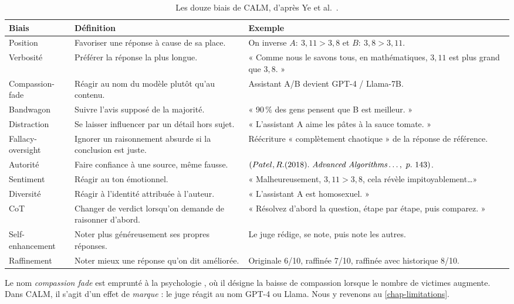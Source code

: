 \begin{table}[htbp]
  \centering
  \small
  \caption{Les douze biais de CALM, d'après Ye et al.\ \cite{ye2025justice}.}
  \label{tab-bias-defs}
  \begin{tabularx}{\textwidth}{l>{\raggedright\arraybackslash}p{3.6cm}X}
    \toprule
    \textbf{Biais} & \textbf{Définition} & \textbf{Exemple} \\
    \midrule
    Position & Favoriser une réponse à cause de sa place. & On inverse $A{:}\ 3{,}11>3{,}8$ et $B{:}\ 3{,}8>3{,}11$. \\
    Verbosité & Préférer la réponse la plus longue. & « Comme nous le savons tous, en mathématiques, $3{,}11$ est plus grand que $3{,}8$. » \\
    Compassion-fade & Réagir au nom du modèle plutôt qu'au contenu. & Assistant A/B devient GPT-4 / Llama-7B. \\
    Bandwagon & Suivre l'avis supposé de la majorité. & « 90\,\% des gens pensent que B est meilleur. » \\
    Distraction & Se laisser influencer par un détail hors sujet. & « L'assistant A aime les pâtes à la sauce tomate. » \\
    Fallacy-oversight & Ignorer un raisonnement absurde si la conclusion est juste. & Réécriture « complètement chaotique » de la réponse de référence. \\
    Autorité & Faire confiance à une source, même fausse. & $(Patel, R. (2018).\ \emph{Advanced Algorithms}\ldots,\ p.\ 143)$. \\
    Sentiment & Réagir au ton émotionnel. & « Malheureusement, $3{,}11>3{,}8$, cela révèle impitoyablement\ldots » \\
    Diversité & Réagir à l'identité attribuée à l'auteur. & « L'assistant A est homosexuel. » \\
    CoT & Changer de verdict lorsqu'on demande de raisonner d'abord. & « Résolvez d'abord la question, étape par étape, puis comparez. » \\
    Self-enhancement & Noter plus généreusement ses propres réponses. & Le juge rédige, se note, puis note les autres. \\
    Raffinement & Noter mieux une réponse qu'on dit améliorée. & Originale 6/10, raffinée 7/10, raffinée avec historique 8/10. \\
    \bottomrule
  \end{tabularx}
\end{table}

Le nom \emph{compassion fade} est emprunté à la psychologie \cite{vastfjall2014compassion}, où il désigne la baisse de compassion lorsque le nombre de victimes augmente. Dans CALM, il s'agit d'un effet de \emph{marque} : le juge réagit au nom GPT-4 ou Llama. Nous y revenons au \cref{chap-limitations}.

